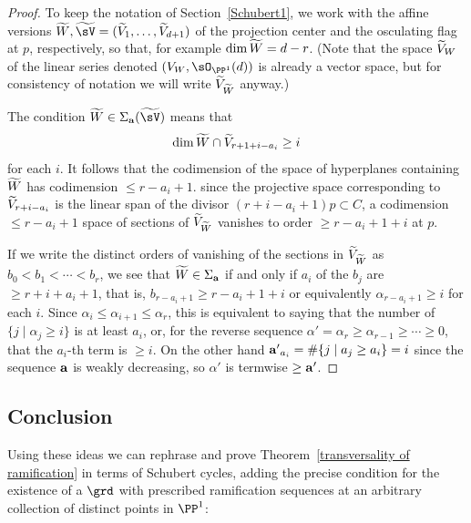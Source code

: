 %


\begin{proof}
To keep the notation of Section~\ref{Schubert1}, we work with the affine versions
$\tL, \tsV = (\tV_1, \dots, \tV_{d+1})$ of the projection center and the osculating flag at $p$, respectively,
so that, for example $\dim \tL = d-r$. (Note that the space $\tV_W$ of the linear series 
denoted $(V_W, \sO_{\PP^1}(d))$ 
is already a vector space, but for consistency of notation we will write $\tV_\tL$ anyway.)

The condition $\tL \in \Sigma_{\bf a}({\tsV})$
 means that 
$$
\dim \tL \cap \tV_{r+1+i-a_i} \geq i
$$
for each $i$. 
It follows that the codimension of the space of hyperplanes containing $\tL$ has codimension $\leq r-a_i+1$.
since the projective space corresponding to $\tV_{r+i-a_i}$ is the linear span of the divisor $(r+i-a_i+1)p\subset C$,
a codimension $\leq r-a_i+1$ space of sections of $\tV_\tL$  vanishes to order $\geq r -a_i+1+i$ at $p$. 

If we write the distinct orders of vanishing of the sections in $\tV_\tL$ as
$b_0 < b_1<  \cdots < b_r$, we see that $\tL \in \Sigma_{\bf a}$  if and only if
$a_i$ of the $b_j$ are $\geq r+i+a_i+1$, that is,
$b_{r-a_i+1}\geq r-a_i+1+i$ or equivalently $\alpha_{r-a_i+1}\geq i$ for each $i$.
Since $\alpha_i\leq \alpha_{i+1} \leq \alpha_r$,
this is equivalent to saying that the number of $\{j \mid \alpha_j \geq i\}$ is at least $a_i$, or, for the
reverse sequence $\alpha' = \alpha_r \geq \alpha_{r-1} \geq \cdots \geq 0$, that the $a_i$-th term is $\geq i$.
On the other hand ${\bf a'}_{a_i} = \#\{j\mid a_j \geq a_i\} = i$ since the sequence ${\bf a}$ is weakly
decreasing, so $\alpha'$ is termwise $\geq {\bf a'}$.
\end{proof}

\subsection{Conclusion}

Using these ideas we  can rephrase and prove Theorem~\ref{transversality of ramification} in terms of Schubert cycles,
adding the precise condition for the existence of a $\grd$ with prescribed ramification sequences
at an arbitrary collection of distinct points in $\PP^{1}$:

